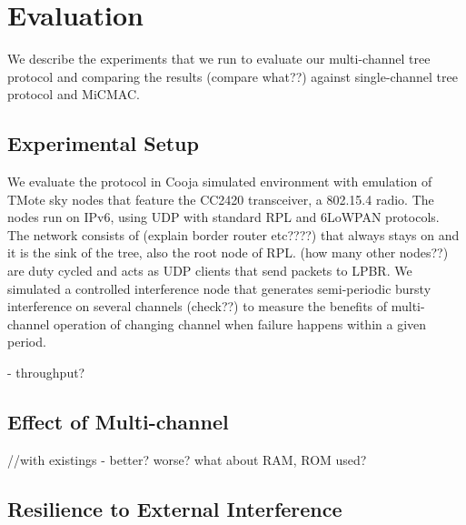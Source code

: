 \section{Evaluation}
We describe the experiments that we run to evaluate our multi-channel tree protocol and comparing the results (compare what??) against single-channel tree protocol and MiCMAC.

\subsection{Experimental Setup}
We evaluate the protocol in Cooja simulated environment with emulation of TMote sky nodes that feature the CC2420 transceiver, a 802.15.4 radio. The nodes run on IPv6, using UDP with standard RPL and 6LoWPAN protocols. The network consists of (explain border router etc????) that always stays on and it is the sink of the tree, also the root node of RPL. (how many other nodes??) are duty cycled and acts as UDP clients that send packets to LPBR. We simulated a controlled interference node that generates semi-periodic bursty interference on several channels (check??) to measure the benefits of multi-channel operation of changing channel when failure happens within a given period. 

- throughput?

\subsection{Effect of Multi-channel}
//with existings - better? worse? what about RAM, ROM used?

\subsection{Resilience to External Interference}